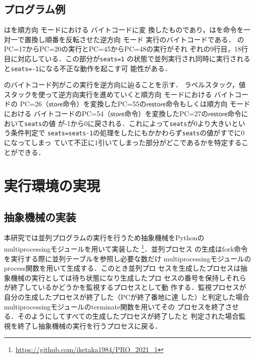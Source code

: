\documentclass[submit,PRO]{ipsj}
\newcommand{\bcode}[1]{$\mathsf{#1}$}
\begin{document}
\subsection{プログラム例}

はを順方向%
モードにおける%
バイトコードに変
換したものであり，はを命令を一
対一で置換し順番を反転させた逆方向%
モード%
実行のバイトコードである．
のPC=17からPC=20の実行とPC=45からPC=48の実行がそれ
ぞれの9行目，18行目に対応している．この部分が\texttt{seats=1}
の状態で並列実行され同時に実行されると\texttt{seats=-1}になる不正な動作を起こす可
能性がある．

のバイトコード列がこの実行を逆方向に辿ることを示す．
ラベルスタック，値スタックを使って逆方向実行を進めていくと順方向%
モードにおける%
バイトコードの
PC=26（\bcode{store}命令）を変換したPC=55の\bcode{restore}命令もしくは順方向%
モードにおける%
バイトコードのPC=54（\bcode{store}命令）を変換したPC=27の\bcode{restore}命令において\texttt{seats}の値
が-1から0に戻される．これによって\texttt{seats}が0より大きいという条件判定で
\texttt{seats=seats-1}の処理をしたにもかかわらず\texttt{seats}の値がすでに0になってしまっ
ていて不正に1引いてしまった部分がどこであるかを特定することができる．

\section{実行環境の実現}

\subsection{抽象機械の実装}

本研究では並列プログラムの実行を行うため抽象機械をPythonの
multiprocessingモジュールを用いて実装した
\footnote{\url{https://github.com/iketaka1984/PRO_2021_1}}．並列プロセス
の生成はfork命令を実行する際に並列テーブルを参照し必要な数だけ
multiprocessingモジュールのprocess関数を用いて生成する．このとき並列プロ
セスを生成したプロセスは抽象機械の実行としては待ち状態になり生成したプロ
セスの番号を保持しそれらが終了しているかどうかを監視するプロセスとして動
作する．監視プロセスが自分の生成したプロセスが終了した（PCが終了番地に達
した）と判定した場合multiprocessingモジュールのterminate関数を用いてその
プロセスを終了させる．そのようにしてすべての生成したプロセスが終了したと
判定された場合監視を終了し抽象機械の実行を行うプロセスに戻る．
\end{document}
